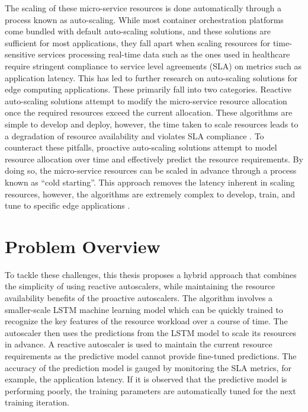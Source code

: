 The scaling of these micro-service resources is done automatically through a process known as auto-scaling. While most container orchestration platforms come bundled with default auto-scaling solutions, and these solutions are sufficient for most applications, they fall apart when scaling resources for time-sensitive services processing real-time data such as the ones used in healthcare require stringent compliance to service level agreements (SLA) on metrics such as application latency. This has led to further research on auto-scaling solutions for edge computing applications. These primarily fall into two categories. Reactive auto-scaling solutions attempt to modify the micro-service resource allocation once the required resources exceed the current allocation. These algorithms are simple to develop and deploy, however, the time taken to scale resources leads to a degradation of resource availability and violates SLA compliance \cite{podolskiy2018iaas}. To counteract these pitfalls, proactive auto-scaling solutions attempt to model resource allocation over time and effectively predict the resource requirements. By doing so, the micro-service resources can be scaled in advance through a process known as ``cold starting''. This approach removes the latency inherent in scaling resources, however, the algorithms are extremely complex to develop, train, and tune to specific edge applications \cite{straesser2022not}.

\section{Problem Overview}
\label{sec:ch1-problem-overview}

To tackle these challenges, this thesis proposes a hybrid approach that combines the simplicity of using reactive autoscalers, while maintaining the resource availability benefits of the proactive autoscalers. The algorithm involves a smaller-scale LSTM machine learning model which can be quickly trained to recognize the key features of the resource workload over a course of time. The autoscaler then uses the predictions from the LSTM model to scale its resources in advance. A reactive autoscaler is used to maintain the current resource requirements as the predictive model cannot provide fine-tuned predictions. The accuracy of the prediction model is gauged by monitoring the SLA metrics, for example, the application latency. If it is observed that the predictive model is performing poorly, the training parameters are automatically tuned for the next training iteration.\par

